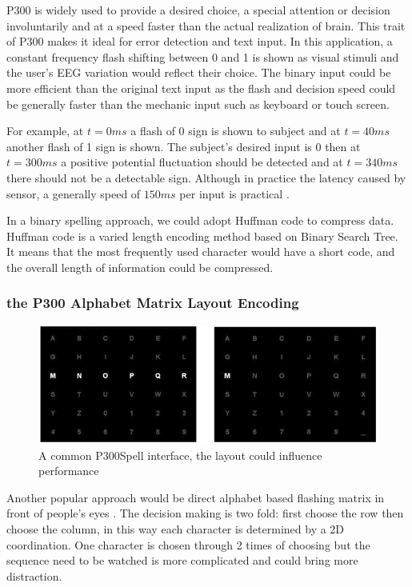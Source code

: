 \documentclass[a4paper]{article}
\begin{document}
P300 is widely used to provide a desired choice, a special attention or decision involuntarily and at a speed faster than the actual realization of brain. This trait of P300 makes it ideal for error detection and text input. In this application, a constant frequency flash shifting between 0 and 1 is shown as visual stimuli and the user's EEG variation would reflect their choice. The binary input could be more efficient than the original text input as the flash and decision speed could be generally faster than the mechanic input such as keyboard or touch screen.

For example, at $t = 0 ms$ a flash of 0 sign is shown to subject and at $t = 40 ms$ another flash of 1 sign is shown. The subject's desired input is 0 then at $t = 300 ms$ a positive potential fluctuation should be detected and at $t = 340 ms$ there should not be a detectable sign. Although in practice the latency caused by sensor, a generally speed of $150 ms$ per input is practical \autocite{sakai2012alphabet}. 

In a binary spelling approach, we could adopt Huffman code to compress data. Huffman code is a varied length encoding method based on Binary Search Tree. It means that the most frequently used character would have a short code, and the overall length of information could be compressed.

\subsubsection{the P300 Alphabet Matrix Layout Encoding}

\begin{figure}
	\centering
	\includegraphics[width=0.8 \linewidth]{P300Spell}
	\caption{A common P300Spell interface, the layout could influence performance}
	\label{fig:P300Spell}
\end{figure}

Another popular approach would be direct alphabet based flashing matrix in front of people's eyes \autocite{sakai2012alphabet}. The decision making is two fold: first choose the row then choose the column, in this way each character is determined by a 2D coordination. One character is chosen through 2 times of choosing but the sequence need to be watched is more complicated and could bring more distraction.
\end{document}
